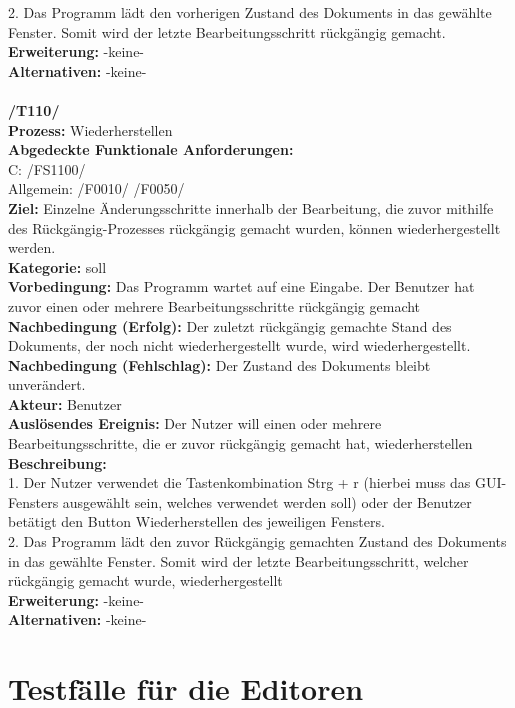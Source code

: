 \documentclass[a4paper]{scrreprt}
\begin{document}
2. Das Programm lädt den vorherigen Zustand des Dokuments in das gewählte Fenster. Somit wird der letzte Bearbeitungsschritt rückgängig gemacht. \\
\textbf {Erweiterung:} -keine- \\
\textbf {Alternativen:} -keine- \\\\
\textbf{/T110/} \\ 
\textbf{Prozess: }Wiederherstellen \\
\textbf{Abgedeckte Funktionale Anforderungen:}\\
C: /FS1100/ \\
Allgemein: /F0010/ /F0050/ \\
\textbf{Ziel:} Einzelne Änderungsschritte innerhalb der Bearbeitung, die zuvor mithilfe des Rückgängig-Prozesses rückgängig gemacht wurden, können wiederhergestellt werden.\\
\textbf{Kategorie:} soll\\
\textbf{Vorbedingung:} Das Programm wartet auf eine Eingabe. Der Benutzer hat zuvor einen oder mehrere Bearbeitungsschritte rückgängig gemacht\\
\textbf{Nachbedingung (Erfolg):} Der zuletzt rückgängig gemachte Stand des Dokuments, der noch nicht wiederhergestellt wurde, wird wiederhergestellt.
\textbf{Nachbedingung (Fehlschlag):} Der Zustand des Dokuments bleibt unverändert.\\
\textbf{Akteur:} Benutzer\\
\textbf{Auslösendes Ereignis:} Der Nutzer will einen oder mehrere Bearbeitungsschritte, die er zuvor rückgängig gemacht hat, wiederherstellen\\
\textbf{Beschreibung:} \\
1. Der Nutzer verwendet die Tastenkombination Strg + r (hierbei muss das GUI-Fensters ausgewählt sein, welches verwendet werden soll) oder der Benutzer betätigt den Button Wiederherstellen des jeweiligen Fensters.\\
2. Das Programm lädt den zuvor Rückgängig gemachten Zustand des Dokuments in das gewählte Fenster. Somit wird der letzte Bearbeitungsschritt, welcher rückgängig gemacht wurde, wiederhergestellt \\
\textbf {Erweiterung:} -keine- \\
\textbf {Alternativen:} -keine- \\

\section{Testfälle für die Editoren}
\end{document}
